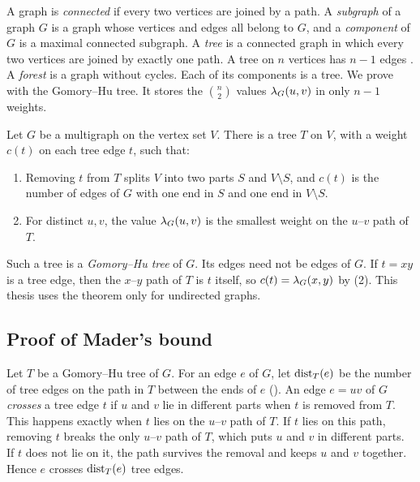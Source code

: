 A graph is \emph{connected} if every two vertices are joined by a path. A \emph{subgraph} of a graph $G$ is a graph whose vertices and edges all belong to $G$, and a \emph{component} of $G$ is a maximal connected subgraph.
A \emph{tree} is a connected graph in which every two vertices are joined by exactly one path. A tree on $n$ vertices has $n-1$ edges \cite[Corollary~1.5.2]{Diestel25}.
A \emph{forest} is a graph without cycles. Each of its components is a tree.
We prove  with the Gomory--Hu tree.
It stores the $\binom n2$ values $\lambda_G(u,v)$ in only $n-1$ weights.

\begin{theorem}\label{thm:gomory-hu}
Let $G$ be a multigraph on the vertex set $V$. There is a tree $T$ on $V$, with a weight $c(t)$ on each tree edge $t$, such that:
\begin{enumerate}[label=(\arabic*)]
\item Removing $t$ from $T$ splits $V$ into two parts $S$ and $V\setminus S$, and $c(t)$ is the number of edges of $G$ with one end in $S$ and one end in $V\setminus S$.
\item For distinct $u,v$, the value $\lambda_G(u,v)$ is the smallest weight on the $u$--$v$ path of $T$.
\end{enumerate}
\end{theorem}
Such a tree is a \emph{Gomory--Hu tree} of $G$. Its edges need not be edges of $G$. If $t=xy$ is a tree edge, then the $x$--$y$ path of $T$ is $t$ itself, so $c(t)=\lambda_G(x,y)$ by (2). This thesis uses the theorem only for undirected graphs.

\subsection{Proof of Mader's bound}\label{sec:mader-gomory-hu}

Let $T$ be a Gomory--Hu tree of $G$.
For an edge $e$ of $G$, let $\operatorname{dist}_T(e)$ be the number of tree edges on the path in $T$ between the ends of $e$ ().
An edge $e=uv$ of $G$ \emph{crosses} a tree edge $t$ if $u$ and $v$ lie in different parts when $t$ is removed from $T$.
This happens exactly when $t$ lies on the $u$--$v$ path of $T$. If $t$ lies on this path, removing $t$ breaks the only $u$--$v$ path of $T$, which puts $u$ and $v$ in different parts. If $t$ does not lie on it, the path survives the removal and keeps $u$ and $v$ together.
Hence $e$ crosses $\operatorname{dist}_T(e)$ tree edges.

